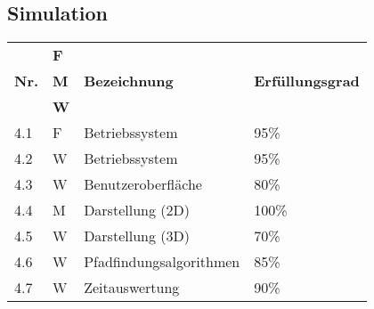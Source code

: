 \documentclass[main.tex]{subfiles} %
\begin{document}
\subsection*{Simulation}

\begin{tabular}{|l|p{0.5cm}|p{4cm}|p{10cm}|}
  \hline
               & \textbf{F} &                                  &                                                                                                                                                                                                                                                                                                                                                                                 \\
  \textbf{Nr.} & \textbf{M} & \textbf{Bezeichnung}             & \textbf{Erfüllungsgrad}                                                                                                                                                                                                                                                                                                                                                                                \\
               & \textbf{W} &                                  &                                                                                                                                                                                                                                                                                                                                                                         \\
  \hline
  4.1          & F              & Betriebssystem               & 95\%                    \\
  4.2          & W              & Betriebssystem               & 95\%                    \\
  4.3          & W              & Benutzeroberfläche           & 80\%                    \\
  4.4          & M              & Darstellung (2D)             & 100\%                   \\
  4.5          & W              & Darstellung (3D)             & 70\%                    \\
  4.6          & W              & Pfadfindungsalgorithmen      & 85\%                    \\
  4.7          & W              & Zeitauswertung               & 90\%                    \\

\end{tabular}
\end{document}

